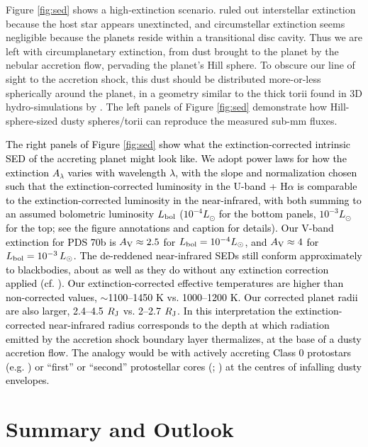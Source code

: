\documentclass[fleqn,usenatbib]{mnras}
\newcommand{\nick}[1]{\textcolor{black}{ #1}}
\begin{document}
Figure \ref{fig:sed} shows a high-extinction scenario.  \citet{wang_etal_2020} ruled out interstellar extinction because the host star appears unextincted, and circumstellar extinction seems negligible because the planets reside within a transitional disc cavity. Thus we are left with circumplanetary extinction, from dust brought to the planet by the nebular accretion flow, pervading the planet's Hill sphere. To obscure our line of sight to the accretion shock, this dust should be distributed more-or-less spherically around the planet, in a geometry similar to the thick torii found in 3D hydro-simulations by \citet[][see their figure 2]{fung_etal_2019}. The left panels of Figure \ref{fig:sed} demonstrate how Hill-sphere-sized dusty  spheres/torii can reproduce the measured sub-mm fluxes. 

\nick{The right panels of Figure \ref{fig:sed} show what the extinction-corrected intrinsic SED of the accreting planet might look like. We adopt power laws for how the extinction $A_{\lambda}$ varies with wavelength $\lambda$, with the slope and normalization chosen such that the extinction-corrected luminosity in the U-band + H$\alpha$ is comparable to the extinction-corrected luminosity in the near-infrared, with both summing to an assumed bolometric luminosity $L_{\rm bol}$ ($10^{-4} L_\odot$ for the bottom panels, $10^{-3} L_\odot$ for the top; see the figure annotations and caption for details). Our V-band extinction for PDS 70b is $A_{\rm V} \approx 2.5$ for $L_{\rm bol} = 10^{-4} L_\odot$, and $A_{\rm V} \approx 4$ for $L_{\rm bol} = 10^{-3}\,L_{\odot}$. The de-reddened near-infrared SEDs still conform approximately to blackbodies, about as well as they do without any extinction correction applied (cf. \citealt{wang_etal_2020}). Our extinction-corrected effective temperatures are higher than non-corrected values, $\sim$1100--1450 K vs. 1000--1200 K. Our corrected planet radii are also larger, 2.4--4.5 $R_{\rm J}$ vs. 2--2.7 $R_{\rm J}$. In this interpretation the extinction-corrected near-infrared radius corresponds to the depth at which radiation emitted by the accretion shock boundary layer thermalizes, at the base of a dusty accretion flow. The analogy would be with actively accreting Class 0 protostars (e.g. \citealt{dunham_etal_2014}) or ``first'' or ``second'' protostellar cores (\citealt{larson_1969}; \citealt{bate_etal_2014}) at the centres of infalling dusty envelopes.}


\section{Summary and Outlook}
\label{sec:discussion}
\end{document}
